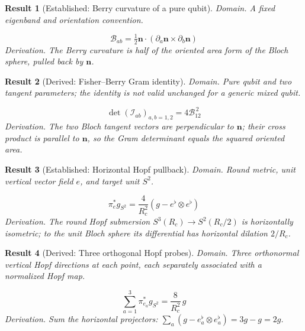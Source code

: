 \documentclass[aps,prd,onecolumn,notitlepage,groupedaddress,11pt]{revtex4-2}
\newtheorem{result}{Result}
\begin{document}
\begin{result}[\textsf{Established}: Berry curvature of a pure qubit]\label{res:39}
\textit{Domain.} A fixed eigenband and orientation convention.\par
\begin{equation}\label{eq:39}
\mathcal B_{ab}=\tfrac12\boldsymbol n\cdot(\partial_a\boldsymbol n\times\partial_b\boldsymbol n)
\end{equation}
\textit{Derivation.} The Berry curvature is half of the oriented area form of the Bloch sphere, pulled back by $\boldsymbol n$.
\end{result}

\begin{result}[\textsf{Derived}: Fisher--Berry Gram identity]\label{res:40}
\textit{Domain.} Pure qubit and two tangent parameters; the identity is not valid unchanged for a generic mixed qubit.\par
\begin{equation}\label{eq:40}
\det(\mathcal I_{ab})_{a,b=1,2}=4\mathcal B_{12}^{\,2}
\end{equation}
\textit{Derivation.} The two Bloch tangent vectors are perpendicular to $\boldsymbol n$; their cross product is parallel to $\boldsymbol n$, so the Gram determinant equals the squared oriented area.
\end{result}

\begin{result}[\textsf{Established}: Horizontal Hopf pullback]\label{res:41}
\textit{Domain.} Round metric, unit vertical vector field $e$, and target unit $S^2$.\par
\begin{equation}\label{eq:41}
\pi_e^*g_{S^2}=\frac4{R_c^2}(g-e^\flat\!\otimes e^\flat)
\end{equation}
\textit{Derivation.} The round Hopf submersion $S^3(R_c)\to S^2(R_c/2)$ is horizontally isometric; to the unit Bloch sphere its differential has horizontal dilation $2/R_c$.
\end{result}

\begin{result}[\textsf{Derived}: Three orthogonal Hopf probes]\label{res:42}
\textit{Domain.} Three orthonormal vertical Hopf directions at each point, each separately associated with a normalized Hopf map.\par
\begin{equation}\label{eq:42}
\sum_{a=1}^3\pi_{e_a}^*g_{S^2}=\frac8{R_c^2}\,g
\end{equation}
\textit{Derivation.} Sum the horizontal projectors: $\sum_a(g-e_a^\flat\otimes e_a^\flat)=3g-g=2g$.
\end{result}
\end{document}
